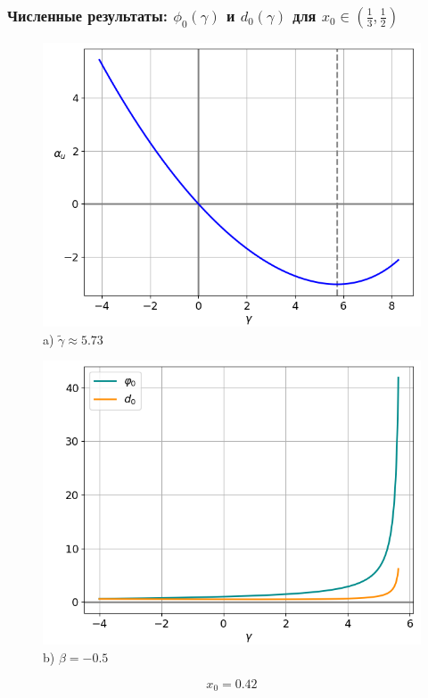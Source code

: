 \documentclass[fullscreen=true, unicode, bookmarks=false]{beamer}
\begin{document}
\begin{frame}
\frametitle{ Численные результаты: $ \phi_0(\gamma) $ и $ d_0(\gamma) $ для $ x_0 \in \left( \frac{1}{3}, \frac{1}{2} \right) $ }

\begin{figure} 
\begin{minipage}[h]{0.49\linewidth}
\begin{center}
\includegraphics[scale=0.38]{x0=0,42.png} \\ {\scriptsize a) $ \widetilde{\gamma} \approx 5.73 $}
\end{center}
\end{minipage} 
\hfill
\begin{minipage}[h]{0.49\linewidth}
\begin{center}
\includegraphics[scale=0.38]{divergent_phi0d0_x0=0,42,beta=0,5_before.png}  \\ {\scriptsize b) $ \beta = -0.5 $}
\end{center}
\end{minipage} 
\end{figure}

$$ x_0 = 0.42 $$

\end{frame}
\end{document}

